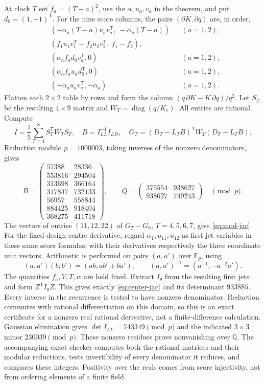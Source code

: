 \documentclass[11pt,reqno]{amsart}
\numberwithin{equation}{section}
\theoremstyle{definition}
\theoremstyle{remark}
\begin{document}
At clock $T$ set $f_a=(T-a)^2$, use the $\alpha,u_a,v_a$ in the theorem, and put $d_0=(1,-1)^{\mathsf T}$. For the nine score columns, the pairs $(\partial K,\partial q)$ are, in order,
\begin{align*}
 &(-\alpha_a(T-a)u_av_a^{\mathsf T},\ -\alpha_a(T-a)) &&(a=1,2),\\
 &(f_1u_1v_1^{\mathsf T}-f_2u_2v_2^{\mathsf T},\ f_1-f_2),&\\
 &(\alpha_af_ad_0v_a^{\mathsf T},0) &&(a=1,2),\\
 &(\alpha_af_au_ad_0^{\mathsf T},0) &&(a=1,2),\\
 &(-\alpha_au_av_a^{\mathsf T},-\alpha_a) &&(a=1,2).
\end{align*}
Flatten each $2\times2$ table by rows and form the column
$(q\,\partial K-K\,\partial q)/q^2$. Let $S_T$ be the resulting $4\times9$ matrix and $W_T=\operatorname{diag}(q/K_e)$. All entries are rational. Compute
\[
 I=\frac15\sum_{T=4}^8 S_T^{\mathsf T}W_TS_T,
 \quad B=I_{LL}^{-1}I_{LD},\quad
 G_T=(D_T-L_TB)^{\mathsf T}W_T(D_T-L_TB).
\]
Reduction modulo $p=1000003$, taking inverses of the nonzero denominators, gives
\[
 B=\begin{pmatrix}
 57388&28336\\553816&294504\\313698&366164\\
 317847&732133\\56957&558844\\884425&918404\\368275&411718
 \end{pmatrix},\qquad
 Q=\begin{pmatrix}375554&938627\\938627&749243\end{pmatrix}
 \quad\pmod p.
\]
The vectors of entries $(11,12,22)$ of $G_T-G_8$, $T=4,5,6,7$, give \eqref{eq:mod-jac}.
For the fixed-design centre derivative, regard $\alpha_1,u_{11},u_{12}$ as first-jet variables in these same score formulas, with their derivatives respectively the three coordinate unit vectors. Arithmetic is performed on pairs $(a,a')$ over $\mathbb F_p$, using
\[
 (a,a')(b,b')=(ab,ab'+ba'),\qquad
 (a,a')^{-1}=(a^{-1},-a^{-2}a').
\]
The quantities $f_a,V,T,w$ are held fixed. Extract $I_\theta$ from the resulting first jets and form $Z^{\mathsf T}I_\theta Z$. This gives exactly \eqref{eq:center-jac} and its determinant $933885$. Every inverse in the recurrence is tested to have nonzero denominator. Reduction commutes with rational differentiation on this domain, so this is an exact certificate for a nonzero real rational derivative, not a finite-difference calculation.
 Gaussian elimination gives $\det I_{LL}=743349\pmod p$ and the indicated $3\times3$ minor $230039\pmod p$. These nonzero residues prove nonvanishing over $\mathbb Q$. The accompanying exact checker computes both the rational matrices and their modular reductions, tests invertibility of every denominator it reduces, and compares these integers. Positivity over the reals comes from score injectivity, not from ordering elements of a finite field.
\end{document}
